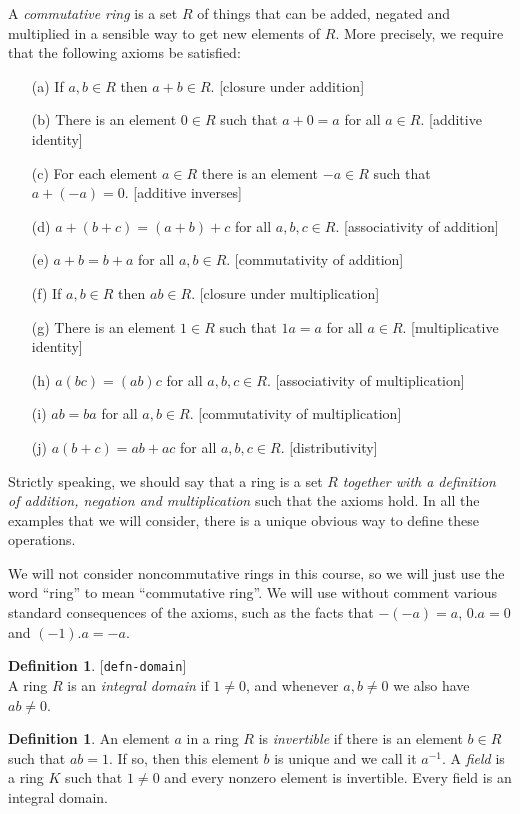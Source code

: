 \documentclass{amsart}
\newcommand{\lbl}[1]{\label{#1}\textup{[\texttt{#1}]}\ \\}
\newcommand{\lbl}{\label}
\renewcommand{\:}{\colon}
\theoremstyle{definition}
\newtheorem{definition}[theorem]{Definition}
\begin{document}
A \emph{commutative ring} is a set $R$ of things that can be added,
negated and multiplied in a sensible way to get new elements of $R$.
More precisely, we require that the following axioms be satisfied:
\begin{itemize}
 \item[(a)] If $a,b\in R$ then $a+b\in R$.
  [closure under addition]
 \item[(b)] There is an element $0\in R$ such that $a+0=a$ for all
  $a\in R$.
  [additive identity]
 \item[(c)] For each element $a\in R$ there is an element $-a\in R$
  such that $a+(-a)=0$. 
  [additive inverses]
 \item[(d)] $a+(b+c)=(a+b)+c$ for all $a,b,c\in R$.
  [associativity of addition]
 \item[(e)] $a+b=b+a$ for all $a,b\in R$.
  [commutativity of addition]
 \item[(f)] If $a,b\in R$ then $ab\in R$.
  [closure under multiplication]
 \item[(g)] There is an element $1\in R$ such that $1a=a$ for all
  $a\in R$.
  [multiplicative identity]
 \item[(h)] $a(bc)=(ab)c$ for all $a,b,c\in R$.
  [associativity of multiplication]
 \item[(i)] $ab=ba$ for all $a,b\in R$.
  [commutativity of multiplication]
 \item[(j)] $a(b+c)=ab+ac$ for all $a,b,c\in R$.
  [distributivity]
\end{itemize}
Strictly speaking, we should say that a ring is a set $R$
\emph{together with a definition of addition, negation and
  multiplication} such that the axioms hold.  In all the examples that
we will consider, there is a unique obvious way to define these
operations.

We will not consider noncommutative rings in this course, so we will
just use the word ``ring'' to mean ``commutative ring''.  We will use
without comment various standard consequences of the axioms, such as
the facts that $-(-a)=a$, $0.a=0$ and $(-1).a=-a$.

\begin{definition}\lbl{defn-domain}
 A ring $R$ is an \emph{integral domain} if $1\neq 0$, and whenever
 $a,b\neq 0$ we also have $ab\neq 0$.
\end{definition}
\begin{definition}
 An element $a$ in a ring $R$ is \emph{invertible} if there is an
 element $b\in R$ such that $ab=1$.  If so, then this element $b$ is
 unique and we call it $a^{-1}$.  A \emph{field} is a ring $K$ such
 that $1\neq 0$ and every nonzero element is invertible.  Every field
 is an integral domain.
\end{definition}
\end{document}
